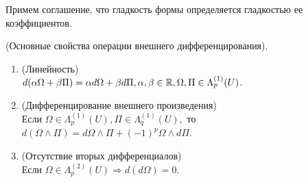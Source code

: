 Примем соглашение, что гладкость формы определяется гладкостью ее коэффициентов.

\begin{theorem}(Основные свойства операции внешнего дифференцирования).
	\begin{enumerate}
		\item(Линейность)\\ $d(\alpha\Omega+\beta\Pi)=\alpha d\Omega+\beta d\Pi, \alpha, \beta\in\R, \Omega, \Pi\in\Lambda_p^{(1)}(U)$.
		\item(Дифференцирование внешнего произведения)\\  Если $\Omega\in\Lambda_p^{(1)}(U), \Pi\in\Lambda_q^{(1)}(U),$ то $d(\Omega\wedge\Pi)=d\Omega\wedge\Pi+(-1)^p\Omega\wedge d\Pi$.
		\item (Отсутствие вторых дифференциалов) \\ Если $\Omega\in\Lambda_p^{(2)}(U)\Rightarrow d(d\Omega)=0$.
	\end{enumerate}
\end{theorem}
